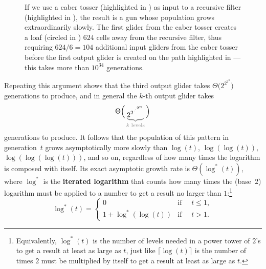 \begin{figure}[!htb]
	\centering
	\caption{If we use a caber tosser (highlighted in ) as input to a recursive filter (highlighted in ), the result is a gun whose population grows extraordinarily slowly. The first glider from the caber tosser creates a loaf (circled in ) $624$ cells away from the recursive filter, thus requiring $624/6 = 104$ additional input gliders from the caber tosser before the first output glider is created on the path highlighted in ---this takes more than $10^{34}$ generations.}\label{fig:recursive_filter_caber}
\end{figure}

Repeating this argument shows that the third output glider takes $\Theta\big(2^{2^{2^n}}\big)$ generations to produce, and in general the $k$-th output glider takes
\[
	\raisebox{0.18cm}{$\displaystyle\Theta\Big($}\begingroup\color{gray}\underbrace{{\color{black}2^{2^{\cdot^{\cdot^{2^n}}}}}}_{\text{\color{gray}$k$ levels}}\endgroup\raisebox{0.18cm}{$\displaystyle\Big)$}
\]
generations to produce. It follows that the population of this pattern in generation~$t$ grows asymptotically more slowly than $\log(t)$, $\log(\log(t))$, $\log(\log(\log(t)))$, and so on, regardless of how many times the logarithm is composed with itself. Its exact asymptotic growth rate is $\Theta(\log^*(t))$, where $\log^*$ is the \textbf{iterated logarithm} that counts how many times the (base~$2$) logarithm must be applied to a number to get a result no larger than $1$:\footnote{Equivalently, $\log^*(t)$ is the number of levels needed in a power tower of $2$'s to get a result at least as large as $t$, just like $\lceil\log(t)\rceil$ is the number of times $2$ must be multiplied by itself to get a result at least as large as $t$.}
\[
	\log^*(t) = \begin{cases}
		0                  & \mbox{if } \quad t \leq 1, \\
		1 + \log^*(\log(t)) & \mbox{if } \quad t > 1.
	\end{cases}
\]


